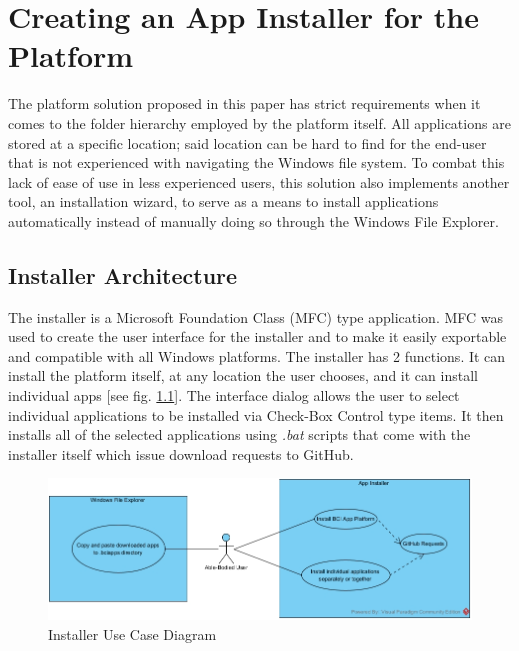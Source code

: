 
\chapter{Creating an App Installer for the Platform}\label{cap:installer}
The platform solution proposed in this paper has strict requirements when it comes to the folder hierarchy employed by the platform itself. All applications are stored at a specific location; said location can be hard to find for the end-user that is not experienced with navigating the Windows file system. To combat this lack of ease of use in less experienced users, this solution also implements another tool, an installation wizard, to serve as a means to install applications automatically instead of manually doing so through the Windows File Explorer.


\section{Installer Architecture} \label{sect: Installer architecture}
The installer is a Microsoft Foundation Class (MFC) type application. MFC was used to create the user interface for the installer and to make it easily exportable and compatible with all Windows platforms. The installer has 2 functions. It can install the platform itself, at any location the user chooses, and it can install individual apps [see fig. \ref{fig:Installer Use Case Diagram}]. The interface dialog allows the user to select individual applications to be installed via Check-Box Control type items. It then installs all of the selected applications using \textit{.bat} scripts that come with the installer itself which issue download requests to GitHub.

\begin{figure}[H]
  \centering
  \includegraphics[width=1\textwidth]{Diagrams/Use Case/Installer.jpg}
  \caption{Installer Use Case Diagram}
  \label{fig:Installer Use Case Diagram}
\end{figure}


